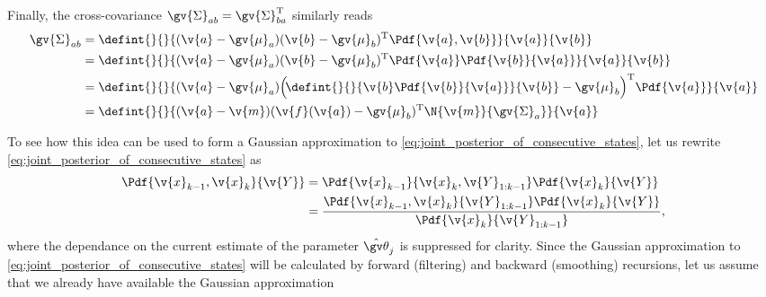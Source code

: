 Finally, the cross-covariance $\gv{\Sigma}_{ab}=\gv{\Sigma}_{ba}^\tr$ similarly reads
\begin{align}
	\gv{\Sigma}_{ab}&=\defint{}{}{(\v{a}-\gv{\mu}_a)(\v{b}-\gv{\mu}_b)^\tr\Pdf{\v{a},\v{b}}}{\v{a}}{\v{b}} \nonumber\\
	&=\defint{}{}{(\v{a}-\gv{\mu}_a)(\v{b}-\gv{\mu}_b)^\tr\Pdf{\v{a}}\Pdf{\v{b}}{\v{a}}}{\v{a}}{\v{b}} \nonumber\\
	&=\defint{}{}{(\v{a}-\gv{\mu}_a)\Big(\!\defint{}{}{\v{b}\Pdf{\v{b}}{\v{a}}}{\v{b}}-\gv{\mu}_b\Big)^\tr\Pdf{\v{a}}}{\v{a}} \nonumber\\
	&=\defint{}{}{(\v{a}-\v{m})(\v{f}(\v{a})-\gv{\mu}_b)^\tr\N{\v{m}}{\gv{\Sigma}_a}}{\v{a}}\label{eq:cross_cov_int}
\end{align}


 
To see how this idea can be used to form a Gaussian
approximation to \eqref{eq:joint_posterior_of_consecutive_states}, let us
rewrite \eqref{eq:joint_posterior_of_consecutive_states} as
\begin{align}
\begin{split}
	\Pdf{\v{x}_{k-1},\v{x}_{k}}{\v{Y}}&=\Pdf{\v{x}_{k-1}}{\v{x}_{k},\v{Y}_{1:k-1}}\Pdf{\v{x}_{k}}{\v{Y}}\\
	&=\frac{\Pdf{\v{x}_{k-1},\v{x}_{k}}{\v{Y}_{1:k-1}}\Pdf{\v{x}_{k}}{\v{Y}}}{\Pdf{\v{x}_{k}}{\v{Y}_{1:k-1}}},
	\label{eq:joint_smooth}
\end{split}
\end{align}
where the dependance on the current estimate of the parameter $\hat{\Th}_j$
is suppressed for clarity. Since the Gaussian approximation to
\eqref{eq:joint_posterior_of_consecutive_states} will be calculated by forward
(filtering) and backward (smoothing) recursions, let us assume that we already
have available the Gaussian approximation

